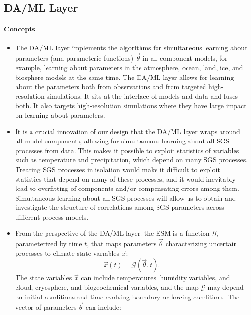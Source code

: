 \documentclass{article}
\begin{document}
\subsection{DA/ML Layer}

\paragraph{Concepts}
\begin{itemize}
    \item The DA/ML layer implements the algorithms for simultaneous learning about parameters (and parameteric functions) $\vec{\theta}$ in all component models, for example, learning about parameters in the atmosphere, ocean, land, ice, and biosphere models at the same time. The DA/ML layer allows for learning about the parameters both from observations and from targeted high-resolution simulations. It sits at the interface of models and data and fuses both. It also targets high-resolution simulations where they have large impact on learning about parameters. 
    \item It is a crucial innovation of our design that the DA/ML layer wraps around all model components, allowing for simultaneous learning about all SGS processes from data. This makes it possible to exploit statistics of variables such as temperature and precipitation, which depend on many SGS processes. Treating SGS processes in isolation would make it difficult to exploit statistics that depend on many of these processes, and it would inevitably lead to overfitting of components and/or compensating errors among them. Simultaneous learning about all SGS processes will allow us to obtain and investigate the structure of correlations among SGS parameters across different process models.
    \item From the perspective of the DA/ML layer, the ESM is a function $\mathcal{G}$, parameterized by time $t$, that maps parameters $\vec{\theta}$ characterizing uncertain processes to climate state variables $\vec{x}$:
    \begin{equation}
    \vec{x}(t) = \mathcal{G}(\vec{\theta}, t).
    \end{equation}
    The state variables $\vec{x}$ can include temperatures, humidity variables, and cloud, cryosphere, and biogeochemical variables, and the map $\mathcal{G}$ may depend on initial conditions and time-evolving boundary or forcing conditions. The vector of parameters $\vec{\theta}$ can include:
        \begin{itemize}

\end{itemize}
\end{itemize}
\end{document}
